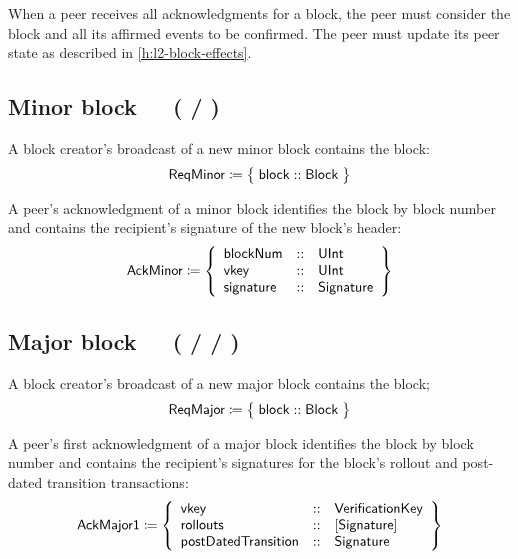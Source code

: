 \documentclass[../hydrozoa.tex]{subfiles}
\begin{document}
When a peer receives all acknowledgments for a block, the peer must consider the block and all its affirmed events to be confirmed.
The peer must update its peer state as described in \cref{h:l2-block-effects}.

\subsection{Minor block~~~( / )}%
\label{h:l2-consensus-minor-block}%

A block creator's broadcast of a new minor block contains the block:
\begin{equation*}
  \mathsf{ReqMinor} \coloneq \;\bigr\{\; \mathsf{block} :: \mathsf{Block} \;\bigr\}
\end{equation*}

A peer's acknowledgment of a minor block identifies the block by block number and contains the recipient's signature of the new block's header:
\begin{equation*}
  \mathsf{AckMinor} \coloneq \left\{
  \begin{array}{lll}
    \mathsf{blockNum} &::& \mathsf{UInt} \\
    \mathsf{vkey} &::& \mathsf{UInt} \\
    \mathsf{signature} &::& \mathsf{Signature}
  \end{array}\right\}
\end{equation*}

\subsection{Major block~~~( /  / )}%
\label{h:l2-consensus-major-block}%

A block creator's broadcast of a new major block contains the block;
\begin{equation*}
  \mathsf{ReqMajor} \coloneq \;\bigr\{\; \mathsf{block} :: \mathsf{Block} \;\bigr\}
\end{equation*}

A peer's first acknowledgment of a major block identifies the block by block number and contains the recipient's signatures for the block's rollout and post-dated transition transactions:
\begin{equation*}
  \mathsf{AckMajor1} \coloneq \left\{
  \begin{array}{lll}
    \mathsf{vkey} &::& \mathsf{VerificationKey} \\
    \mathsf{rollouts} &::& [\mathsf{Signature}] \\
    \mathsf{postDatedTransition} &::& \mathsf{Signature}
  \end{array}\right\}
\end{equation*}
\end{document}

